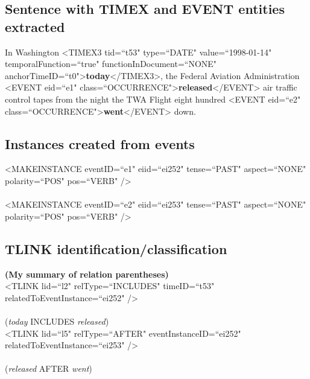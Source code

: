 \documentclass[11pt]{article}
\begin{document}
\subsection*{Sentence with TIMEX and EVENT entities extracted}
In Washington {\textless}TIMEX3 tid=``t53" type=``DATE" value=``1998-01-14" temporalFunction=``true" functionInDocument=``NONE" anchorTimeID=``t0"{\textgreater}\textbf{today}{\textless}/TIMEX3{\textgreater}, the Federal Aviation Administration {\textless}EVENT eid=``e1" class=``OCCURRENCE"{\textgreater}\textbf{released}{\textless}/EVENT{\textgreater} air traffic control tapes from the night the TWA Flight eight hundred {\textless}EVENT eid=``e2" class=``OCCURRENCE"{\textgreater}\textbf{went}{\textless}/EVENT{\textgreater} down.\\

\subsection*{Instances created from events}
{\textless}MAKEINSTANCE eventID=``e1" eiid=``ei252" tense=``PAST" aspect=``NONE" polarity=``POS" pos=``VERB" /{\textgreater}\\\\
{\textless}MAKEINSTANCE eventID=``e2" eiid=``ei253" tense=``PAST" aspect=``NONE" polarity=``POS" pos=``VERB" /{\textgreater}\\

\subsection*{TLINK identification/classification}
\textbf{(My summary of relation parentheses)}\\

{\textless}TLINK lid=``l2" relType=``INCLUDES" timeID=``t53" relatedToEventInstance=``ei252" /{\textgreater}\\\\
(\emph{today} INCLUDES \emph{released})\\

{\textless}TLINK lid=``l5" relType=``AFTER" eventInstanceID=``ei252" relatedToEventInstance=``ei253" /{\textgreater}\\\\
(\emph{released} AFTER \emph{went})
\end{document}
